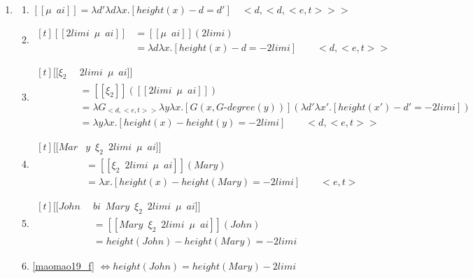\documentclass{ctexart}
\begin{document}
\begin{enumerate}
    \item \label{maomao19}
    \begin{enumerate}
        \item \label{maomao19_b}
        $[\![\mu \enspace ai]\!]=\lambda d' \lambda d \lambda x.[height(x)-d=d'] \quad <d,<d,<e,t>>>$

        \item \label{maomao19_c}
        $\begin{aligned}[t]
            [\![2limi \enspace \mu \enspace ai]\!] &= [\![\mu \enspace ai]\!](2limi) \\
            &= \lambda d \lambda x. [height(x) - d = -2 limi] \qquad <d,<e,t>>
        \end{aligned}$

        \item \label{maomao19_d}
        $\begin{aligned}[t]
            [\![\xi_2 \enspace & 2limi \enspace \mu \enspace ai]\!] \\
            &= [\![\xi_2]\!]([\![2limi \enspace \mu \enspace ai]\!]) \\
            &= \lambda G_{<d,<e,t>>} \lambda y \lambda x. [G(x,G \mbox{-} degree(y))](\lambda d' \lambda x'. [height(x') - d' = -2 limi])\\
            &= \lambda y \lambda x. [height(x) - height(y) = -2 limi] \qquad <d,<e,t>>
        \end{aligned}$

        \item \label{maomao19_e}
        $\begin{aligned}[t]
            [\![Mar&y \enspace \xi_2 \enspace 2limi \enspace \mu \enspace ai]\!] \\
            &= [\![\xi_2 \enspace 2limi \enspace \mu \enspace ai]\!](Mary) \\
            &=\lambda x.[height(x) - height(Mary)=-2limi] \qquad <e,t>
        \end{aligned}$

        \item \label{maomao19_f}
        $\begin{aligned}[t]
            [\![John \enspace &bi \enspace Mary \enspace \xi_2 \enspace 2limi \enspace \mu \enspace ai]\!] \\
            &= [\![Mary \enspace \xi_2 \enspace 2limi \enspace \mu \enspace ai]\!](John) \\
            &=height(John) - height(Mary) = -2limi
        \end{aligned}$

        \item \label{maomao19_g}
        \ref{maomao19_f} $\Leftrightarrow height(John) = height(Mary) - 2limi$

    \end{enumerate}
\end{enumerate}
\end{document}
